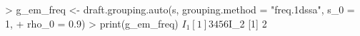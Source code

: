 \begin{CodeChunk}
\begin{CodeInput}


> g_em_freq <- draft.grouping.auto(s, grouping.method = "freq.1dssa", s_0 = 1, 
+                                  rho_0 = 0.9)
> print(g_em_freq)
$I_1
[1] 3 4 5 6
$I_2
[1] 2
\end{CodeInput}

\end{CodeChunk}